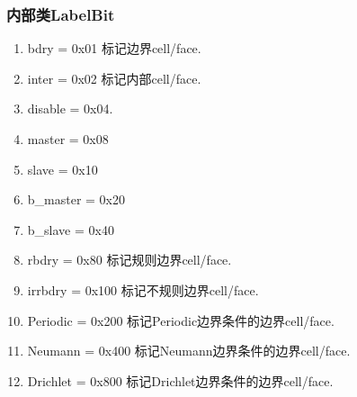 \documentclass[a4paper]{book}
\numberwithin{equation}{chapter}
\theoremstyle{definition}
\begin{document}
\subsubsection{内部类LabelBit}
\begin{enumerate}
  \item bdry = 0x01 标记边界cell/face.
  \item inter = 0x02 标记内部cell/face.
  \item disable = 0x04.
  \item master = 0x08
  \item slave = 0x10
  \item b\_master = 0x20
  \item b\_slave = 0x40
  \item rbdry = 0x80 标记规则边界cell/face.
  \item irrbdry = 0x100 标记不规则边界cell/face.
  \item Periodic = 0x200 标记Periodic边界条件的边界cell/face.
  \item Neumann = 0x400 标记Neumann边界条件的边界cell/face.
  \item Drichlet = 0x800 标记Drichlet边界条件的边界cell/face.
\end{enumerate}
\end{document}
